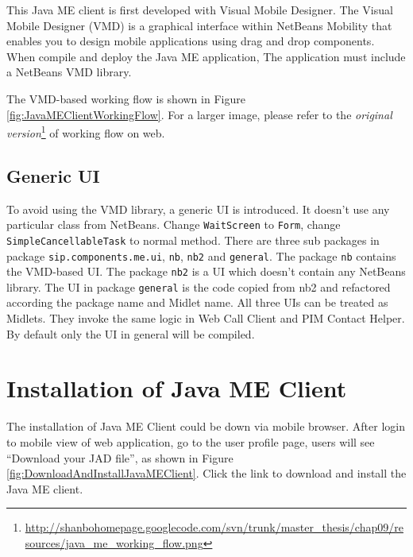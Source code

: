 This Java ME client is first developed with Visual Mobile Designer. The Visual Mobile Designer (VMD) is a graphical interface within NetBeans Mobility that enables you to design mobile applications using drag and drop components. When compile and deploy the Java ME application, The application must include a NetBeans VMD library.

The VMD-based working flow is shown in Figure \ref{fig:JavaMEClientWorkingFlow}. For a larger image, please refer to the \textit{original version}\footnote{\url{http://shanbohomepage.googlecode.com/svn/trunk/master_thesis/chap09/resources/java_me_working_flow.png}} of working flow on web. 

\begin{sidewaysfigure}[!hbtp]
\centering
{}
\caption{Java ME Client Working Flow}
\label{fig:JavaMEClientWorkingFlow}
\end{sidewaysfigure}


\subsection{Generic UI}
\label{sec:JavaMEClient:UserInterface:GenericUI}

To avoid using the VMD library, a generic UI is introduced. It doesn't use any particular class from NetBeans. Change \texttt{WaitScreen} to \texttt{Form}, change \\ \texttt{SimpleCancellableTask} to normal method. There are three sub packages in package \texttt{sip.components.me.ui}, \texttt{nb}, \texttt{nb2} and \texttt{general}. The package \texttt{nb} contains the VMD-based UI. The package \texttt{nb2} is a UI which doesn't contain any NetBeans library. The UI in package \texttt{general} is the code copied from nb2 and refactored according the package name and Midlet name. All three UIs can be treated as Midlets.  They invoke the same logic in \textsf{Web Call Client} and \textsf{PIM Contact Helper}. By default only the UI in general will be compiled.

\section{Installation of Java ME Client}
\label{sec:JavaMEClient:InstallationOfJavaMEClient}

The installation of Java ME Client could be down via mobile browser. After login to mobile view of web application, go to the user profile page, users will see ``Download your JAD file'', as shown in Figure \ref{fig:DownloadAndInstallJavaMEClient}. Click the link to download and install the Java ME client.

